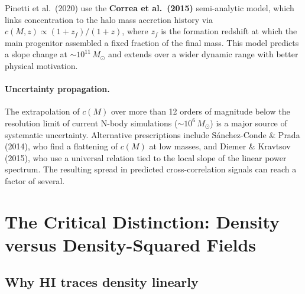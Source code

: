 \documentclass[10pt,a4paper]{article}
\newcommand{\Msun}{M_\odot}
\begin{document}
Pinetti et al.\ (2020) use the \textbf{Correa et al.\ (2015)} semi-analytic model, which links concentration to the halo mass accretion history via $c(M, z) \propto (1 + z_f)/(1 + z)$, where $z_f$ is the formation redshift at which the main progenitor assembled a fixed fraction of the final mass. This model predicts a slope change at $\sim 10^{11} \, \Msun$ and extends over a wider dynamic range with better physical motivation.

\paragraph{Uncertainty propagation.} The extrapolation of $c(M)$ over more than 12 orders of magnitude below the resolution limit of current N-body simulations ($\sim 10^6 \, \Msun$) is a major source of systematic uncertainty. Alternative prescriptions include S\'{a}nchez-Conde \& Prada (2014), who find a flattening of $c(M)$ at low masses, and Diemer \& Kravtsov (2015), who use a universal relation tied to the local slope of the linear power spectrum. The resulting spread in predicted cross-correlation signals can reach a factor of several.


\section{The Critical Distinction: Density versus Density-Squared Fields}
\label{sec:part3}

\subsection{Why HI traces density linearly}
\end{document}
